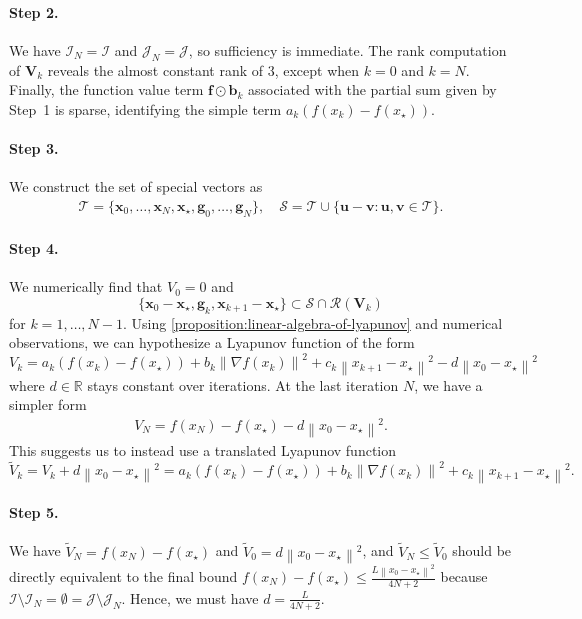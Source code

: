 \documentclass{article}
\theoremstyle{definition}
\theoremstyle{plain}
\newcommand{\vb}{{\mathbf{b}}}
\newcommand{\vf}{{\mathbf{f}}}
\newcommand{\vg}{{\mathbf{g}}}
\newcommand{\vu}{{\mathbf{u}}}
\newcommand{\vv}{{\mathbf{v}}}
\newcommand{\vx}{{\mathbf{x}}}
\newcommand{\vV}{{\mathbf{V}}}
\newcommand{\cI}{{\mathcal{I}}}
\newcommand{\cJ}{{\mathcal{J}}}
\newcommand{\cR}{{\mathcal{R}}}
\newcommand{\cS}{{\mathcal{S}}}
\newcommand{\cT}{{\mathcal{T}}}
\newcommand{\reals}{\mathbb{R}}
\newcommand{\sqnorm}[1]{\left\| #1 \right\|^2}
\newcommand{\norm}[1]{\left\|#1\right\|}
\begin{document}
\paragraph{Step 2.} We have $\cI_N = \cI$ and $\cJ_N = \cJ$, so sufficiency is immediate.
The rank computation of $\vV_k$ reveals the almost constant rank of $3$, except when $k=0$ and $k=N$.
Finally, the function value term $\vf \odot \vb_k$ associated with the partial sum given by Step~1 is sparse, identifying the simple term $a_k (f(x_k) - f(x_\star))$.

\paragraph{Step 3.} We construct the set of special vectors as 
\begin{align*}
    \cT = \{\vx_0, \dots, \vx_{N}, \vx_\star, \vg_0, \dots, \vg_N \} , \quad \cS = \cT \cup \{\vu - \vv: \vu, \vv \in \cT \} .
\end{align*}

\paragraph{Step 4.} We numerically find that $V_0 = 0$ and
\[
    \{\vx_0 - \vx_\star , \vg_k , \vx_{k+1} - \vx_\star \} \subset \cS \cap \cR(\vV_k)
\]
for $k=1,\dots,N-1$.
Using \cref{proposition:linear-algebra-of-lyapunov} and numerical observations, we can hypothesize a Lyapunov function of the form
\begin{equation*}
    V_k = a_k ( f(x_k) - f(x_\star) ) +  b_k \norm{ \nabla f(x_k) }^2 + c_k \norm{ x_{k+1} - x_\star }^2 - d \norm{ x_{0} - x_\star }^2
\end{equation*}
where $d \in \reals$ stays constant over iterations.
At the last iteration $N$, we have a simpler form
\begin{align*}
    V_N = f(x_N) - f(x_\star) - d\sqnorm{x_0 - x_\star} .
\end{align*}
This suggests us to instead use a translated Lyapunov function 
\[
    \widetilde{V}_k = V_k + d\sqnorm{x_0 - x_\star} = a_k ( f(x_k) - f(x_\star) ) +  b_k \norm{ \nabla f(x_k) }^2 + c_k \norm{ x_{k+1} - x_\star }^2 .
\]

\paragraph{Step 5.} We have $\widetilde{V}_N = f(x_N) - f(x_\star)$ and $\widetilde{V}_0 = d\sqnorm{x_0 - x_\star}$, 
and $\widetilde{V}_N \le \widetilde{V}_0$ should be directly equivalent to the final bound $f(x_N) - f(x_\star) \le \frac{L\sqnorm{x_0 - x_\star}}{4N+2}$ because $\cI \setminus \cI_N = \emptyset = \cJ \setminus \cJ_N$.
Hence, we must have $d=\frac{L}{4N+2}$.
\end{document}
